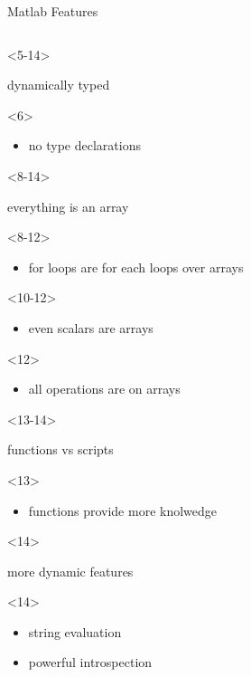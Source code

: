 \begin{frame}[fragile]{Matlab Features}
\begin{columns}
\begin{column}{5cm}
\begin{itemize}
        
        \begin{onlyenv}<5-14>
        \item dynamically typed
          \begin{onlyenv}<6>
            \begin{itemize}
            \item no type declarations
            \end{itemize}         
          \end{onlyenv}
        \end{onlyenv}

        \begin{onlyenv}<8-14>
        \item everything is an array
          \begin{onlyenv}<8-12>
            \begin{itemize}
            \item for loops are for each loops over arrays
            \end{itemize}    
          \end{onlyenv}
          \begin{onlyenv}<10-12>
            \begin{itemize}
            \item even scalars are arrays
            \end{itemize}    
          \end{onlyenv}
          \begin{onlyenv}<12>
            \begin{itemize}
            \item all operations are on arrays
            \end{itemize}    
          \end{onlyenv}
        \end{onlyenv}

        \begin{onlyenv}<13-14>
        \item functions vs scripts
          \begin{onlyenv}<13>
            \begin{itemize}
            \item functions provide more knolwedge
            \end{itemize}         
          \end{onlyenv}
        \end{onlyenv}

        \begin{onlyenv}<14>
        \item more dynamic features
          \begin{onlyenv}<14>
            \begin{itemize}
            \item string evaluation
            \item powerful introspection
            \end{itemize}         
          \end{onlyenv}
        \end{onlyenv}



\end{itemize}
\end{column}
\end{columns}
\end{frame}
